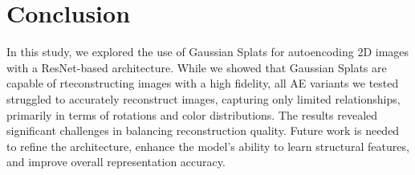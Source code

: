\section{Conclusion}
\label{sec:conclusion}

In this study, we explored the use of Gaussian Splats for autoencoding 2D images with a ResNet-based architecture. While we showed that Gaussian Splats are capable of rteconstructing images with a high fidelity, all AE variants we tested struggled to accurately reconstruct images, capturing only limited relationships, primarily in terms of rotations and color distributions. The results revealed significant challenges in balancing reconstruction quality. Future work is needed to refine the architecture, enhance the model’s ability to learn structural features, and improve overall representation accuracy.
